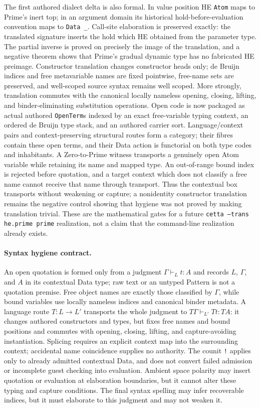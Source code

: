 \documentclass[11pt]{article}
\newcommand{\code}[1]{\texttt{#1}}
\begin{document}
The first authored dialect delta is also formal.  In value position HE
\code{Atom} maps to Prime's inert top; in an argument domain its historical
hold-before-evaluation convention maps to \code{Data \_}.  Call-site elaboration
is preserved exactly: the translated signature inserts the hold which HE obtained
from the parameter type.  The partial inverse is proved on precisely the image of
the translation, and a negative theorem shows that Prime's gradual dynamic type
has no fabricated HE preimage.  Constructor translation changes constructor heads
only; de Bruijn indices and free metavariable names are fixed pointwise, free-name
sets are preserved, and well-scoped source syntax remains well scoped.  More
strongly, translation commutes with the canonical locally nameless opening,
closing, lifting, and binder-eliminating substitution operations.  Open code is
now packaged as actual authored \code{OpenTerm}s indexed by an exact free-variable
typing context, an ordered de Bruijn type stack, and an authored carrier sort.
Language/context pairs and context-preserving structural routes form a category;
their fibres contain these open terms, and their Data action is functorial on
both type codes and inhabitants.  A Zero-to-Prime witness transports a genuinely
open Atom variable while retaining its name and mapped type.  An out-of-range
bound index is rejected before quotation, and a target context which does not
classify a free name cannot receive that name through transport.  Thus the
contextual box transports without weakening or capture; a nonidentity constructor
translation remains the negative control showing that hygiene was not proved by
making translation trivial.  These are
the mathematical gates for a future
\code{cetta --trans he.prime prime} realization,
not a claim that the command-line realization already exists.

\paragraph{Syntax hygiene contract.}
An open quotation is formed only from a judgment
$\Gamma\vdash_L t:A$ and records $L$, $\Gamma$, and $A$ in its contextual Data
type; raw text or an untyped Pattern is not a quotation premise.  Free object
names are exactly those classified by $\Gamma$, while bound variables use
locally nameless indices and canonical binder metadata.  A language route
$T:L\to L'$ transports the whole judgment to
$T\Gamma\vdash_{L'}Tt:TA$: it changes authored constructors and types, but fixes
free names and bound positions and commutes with opening, closing, lifting, and
capture-avoiding instantiation.  Splicing requires an explicit context map into
the surrounding context; accidental name coincidence supplies no authority.
The counit \code{!} applies only to already admitted contextual Data, and does
not convert failed admission or incomplete guest checking into evaluation.
Ambient space polarity may insert quotation or evaluation at elaboration
boundaries, but it cannot alter these typing and capture conditions.  The final
syntax spelling may infer recoverable indices, but it must elaborate to this
judgment and may not weaken it.
\end{document}
